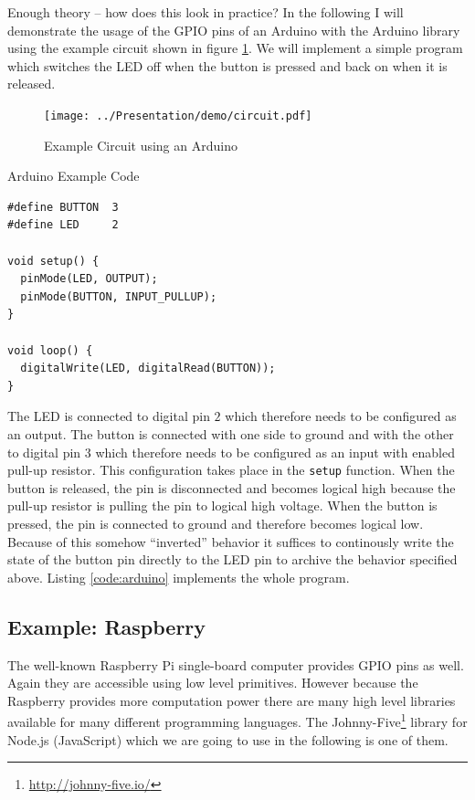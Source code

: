 \documentclass[pdftex,12pt,a4paper,fleqn]{scrartcl}
\begin{document}
Enough theory – how does this look in practice? In the following I will demonstrate the usage of the GPIO pins of an Arduino with the Arduino library using the example circuit shown in figure \ref{fig:arduino_example}. We will implement a simple program which switches the LED off when the button is pressed and back on when it is released.

\begin{figure}[h]	
	\centering
  \texttt{[image: ../Presentation/demo/circuit.pdf]}
  \caption{Example Circuit using an Arduino}
  \label{fig:arduino_example}
\end{figure}

\begin{listing}[h]
\caption{Arduino Example Code}
\label{code:arduino}
\begin{verbatim}
#define BUTTON  3
#define LED     2

void setup() {
  pinMode(LED, OUTPUT);
  pinMode(BUTTON, INPUT_PULLUP);
}

void loop() {
  digitalWrite(LED, digitalRead(BUTTON));
}
\end{verbatim}
\end{listing}

The LED is connected to digital pin $2$ which therefore needs to be configured as an output. The button is connected with one side to ground and with the other to digital pin $3$ which therefore needs to be configured as an input with enabled pull-up resistor. This configuration takes place in the \texttt{setup} function. When the button is released, the pin is disconnected and becomes logical high because the pull-up resistor is pulling the pin to logical high voltage. When the button is pressed, the pin is connected to ground and therefore becomes logical low. Because of this somehow \enquote{inverted} behavior it suffices to continously write the state of the button pin directly to the LED pin to archive the behavior specified above. Listing \ref{code:arduino} implements the whole program.

\subsection{Example: Raspberry}
The well-known Raspberry Pi single-board computer provides GPIO pins as well. Again they are accessible using low level primitives. However because the Raspberry provides more computation power there are many high level libraries available for many different programming languages. The Johnny-Five\footnote{\url{http://johnny-five.io/}} library for Node.js (JavaScript) which we are going to use in the following is one of them.
\end{document}

